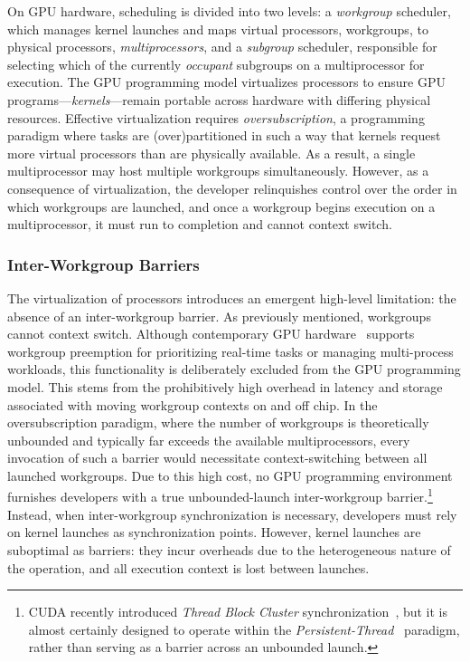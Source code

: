 \documentclass[sigconf]{acmart}
\begin{document}
On GPU hardware, scheduling is divided into two levels: a \emph{workgroup} scheduler, which manages kernel launches and maps virtual processors, workgroups, to physical processors, \emph{multiprocessors}, and a \emph{subgroup} scheduler, responsible for selecting which of the currently \emph{occupant} subgroups on a multiprocessor for execution. The GPU programming model virtualizes processors to ensure GPU programs---\emph{kernels}---remain portable across hardware with differing physical resources. Effective virtualization requires \emph{oversubscription}, a programming paradigm where tasks are (over)partitioned in such a way that kernels request more virtual processors than are physically available. As a result, a single multiprocessor may host multiple workgroups simultaneously. However, as a consequence of virtualization, the developer relinquishes control over the order in which workgroups are launched, and once a workgroup begins execution on a multiprocessor, it must run to completion and cannot context switch.

\subsubsection{Inter-Workgroup Barriers}
The virtualization of processors introduces an emergent high-level limitation: the absence of an inter-workgroup barrier. As previously mentioned, workgroups cannot context switch. Although contemporary GPU hardware~\cite{} supports workgroup preemption for prioritizing real-time tasks or managing multi-process workloads, this functionality is deliberately excluded from the GPU programming model. This stems from the prohibitively high overhead in latency and storage associated with moving workgroup contexts on and off chip. In the oversubscription paradigm, where the number of workgroups is theoretically unbounded and typically far exceeds the available multiprocessors, every invocation of such a barrier would necessitate context-switching between all launched workgroups. Due to this high cost, no GPU programming environment furnishes developers with a true unbounded-launch inter-workgroup barrier.\footnote{CUDA recently introduced \emph{Thread Block Cluster} synchronization~\cite{NvidiaCudaGuide}, but it is almost certainly designed to operate within the \emph{Persistent-Thread}~\cite{gupta2012} paradigm, rather than serving as a barrier across an unbounded launch.} Instead, when inter-workgroup synchronization is necessary, developers must rely on kernel launches as synchronization points. However, kernel launches are suboptimal as barriers: they incur overheads due to the heterogeneous nature of the operation, and all execution context is lost between launches.
\end{document}
